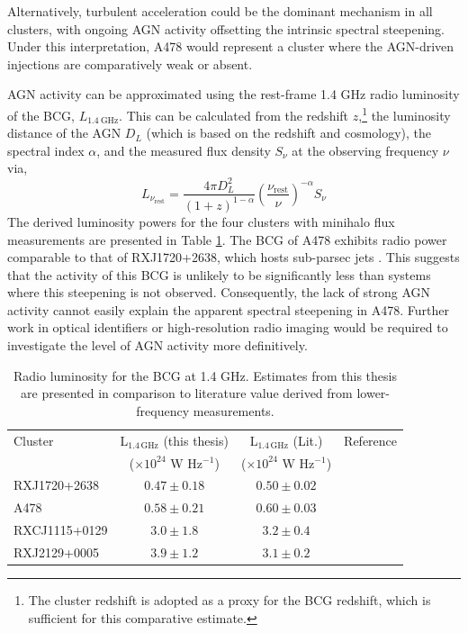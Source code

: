 Alternatively, turbulent acceleration could be the dominant mechanism in all clusters, with ongoing AGN activity offsetting the intrinsic spectral steepening. Under this interpretation, A478 would represent a cluster where the AGN-driven injections are comparatively weak or absent. 

AGN activity can be approximated using the rest-frame 1.4 GHz radio luminosity of the BCG, $L_{1.4\>\mathrm{GHz}}$. This can be calculated from the redshift $z$,\footnote{The cluster redshift is adopted as a proxy for the BCG redshift, which is sufficient for this comparative estimate.} the luminosity distance of the AGN $D_L$ (which is based on the redshift and cosmology), the spectral index $\alpha$, and the measured flux density $S_\nu$ at the observing frequency $\nu$ via,
\begin{equation}
    L_{\nu_{\mathrm{rest}}} = \frac{4\pi D_L^2}{(1+z)^{1-\alpha}}\left(\frac{\nu_{\mathrm{rest}}}{\nu}\right)^{-\alpha}S_\nu
\end{equation}
The derived luminosity powers for the four clusters with minihalo flux measurements are presented in Table \ref{tab:agn_power}. The BCG of A478 exhibits radio power comparable to that of RXJ1720+2638, which hosts sub-parsec jets \citep{Perrott2023}. This suggests that the activity of this BCG is unlikely to be significantly less than systems where this steepening is not observed. Consequently, the lack of strong AGN activity cannot easily explain the apparent spectral steepening in A478. Further work in optical identifiers or high-resolution radio imaging would be required to investigate the level of AGN activity more definitively.

\begin{table}[h]
    \centering
    \begin{threeparttable}
        \caption{Radio luminosity for the BCG at 1.4 GHz. Estimates from this thesis are presented in comparison to literature value derived from lower-frequency measurements.}
        \label{tab:agn_power}
        \begin{tabular}{lccc}
            \toprule
            Cluster & L$_{1.4\,\mathrm{GHz}}$ (this thesis) & L$_{1.4\,\mathrm{GHz}}$ (Lit.) & Reference \\
             & ($\times10^{24}$ W Hz$^{-1}$) & ($\times10^{24}$ W Hz$^{-1}$) & \\
            \midrule
            RXJ1720+2638  & $0.47 \pm 0.18$ & $0.50\pm0.02$ & \citet{Giacintucci2014a} \\
            A478          & $0.58 \pm 0.21$ & $0.60\pm0.03$ & \citet{Giacintucci2014} \\
            RXCJ1115+0129 & $3.0 \pm 1.8$ & $3.2\pm0.4$ & \citet{Trehaeven2023} \\
            RXJ2129+0005  & $3.9 \pm 1.2$ & $3.1\pm0.2$ & \citet{Kale2015} \\
            \bottomrule
        \end{tabular}
    \end{threeparttable}
\end{table}

